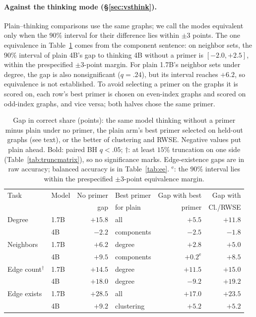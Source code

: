 \documentclass[11pt]{article}
\begin{document}
\paragraph{Against the thinking mode (\S\ref{sec:vsthink}).} Plain--thinking comparisons use the same graphs; we call the modes equivalent only when the $90\%$ interval for their difference lies within $\pm3$ points. The one equivalence in Table~\ref{tab:vsthink} comes from the component sentence: on neighbor sets, the $90\%$ interval of plain 4B's gap to thinking 4B without a primer is $[-2.0,+2.5]$, within the prespecified $\pm3$-point margin. For plain 1.7B's neighbor sets under degree, the gap is also nonsignificant ($q=.24$), but its interval reaches $+6.2$, so equivalence is not established. To avoid selecting a primer on the graphs it is scored on, each row's best primer is chosen on even-index graphs and scored on odd-index graphs, and vice versa; both halves chose the same primer. %
\begin{table}[H]
\centering\scriptsize
\setlength{\tabcolsep}{2.3pt}
\begin{tabular}{llrlrr}
\toprule
Task & Model & No primer & Best primer & Gap with best & Gap with\\
 & & gap & for plain & primer & Cl./RWSE\\
\midrule
Degree & 1.7B & $\mathbf{+15.8}$ & all & $\mathbf{+5.5}$ & $\mathbf{+11.8}$\\ %
 & 4B & $-2.2$ & components & $\mathbf{-2.5}$ & $-1.8$\\ %
Neighbors & 1.7B & $\mathbf{+6.2}$ & degree & $+2.8$ & $\mathbf{+5.0}$\\ %
 & 4B & $\mathbf{+9.5}$ & components & $+0.2^{\mathrm{e}}$ & $\mathbf{+8.5}$\\ %
Edge count$^\dagger$ & 1.7B & $+14.5$ & degree & $+11.5$ & $+15.0$\\ %
 & 4B & $+18.0$ & degree & $-9.2$ & $+19.2$\\ %
Edge exists & 1.7B & $\mathbf{+28.5}$ & all & $\mathbf{+17.0}$ & $\mathbf{+23.5}$\\ %
 & 4B & $\mathbf{+9.2}$ & clustering & $\mathbf{+5.2}$ & $\mathbf{+5.2}$\\ %
\bottomrule
\end{tabular}
\caption{Gap in correct share (points): the same model thinking without a primer minus plain under no primer, the plain arm's best primer selected on held-out graphs (see text), or the better of clustering and RWSE. Negative values put plain ahead. Bold: paired BH $q<.05$; $\dagger$: at least $15\%$ truncation on one side (Table~\ref{tab:truncmatrix}), so no significance marks. Edge-existence gaps are in raw accuracy; balanced accuracy is in Table~\ref{tab:ee}. $^{\mathrm{e}}$: the $90\%$ interval lies within the prespecified $\pm3$-point equivalence margin.} %
\label{tab:vsthink}
\end{table}
\end{document}

